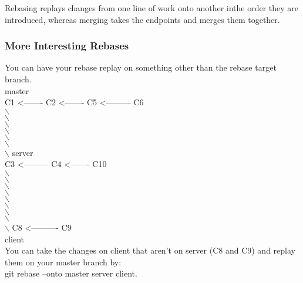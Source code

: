 \documentclass[11pt]{article}
\begin{document}
Rebasing replays changes from one line of work onto another inthe order they are introduced, whereas merging takes the endpoints and merges them together.\\

\subsubsection{More Interesting Rebases}
\label{sec:orgc7d5d7a}
You can have your rebase replay on something other than the rebase target branch.\\

                                     master\\
C1 <------- C2 <------- C5 <--------- C6\\
              $\backslash$\\
               $\backslash$\\
                $\backslash$\\
                 $\backslash$\\
                  $\backslash$\\
                   $\backslash$\\
                    $\backslash$			       	   server\\
                              C3 <---------  C4 <------- C10\\
                        $\backslash$\\
                         $\backslash$\\
                          $\backslash$\\
                           $\backslash$\\
                            $\backslash$\\
                             $\backslash$\\
                                     $\backslash$\\
                               $\backslash$\\
                                $\backslash$  C8 <---------- C9\\
                                                    client\\

You can take the changes on client that aren't on server (C8 and C9) and replay them on your master branch by:\\
git rebase --onto master server client.\\
\end{document}
